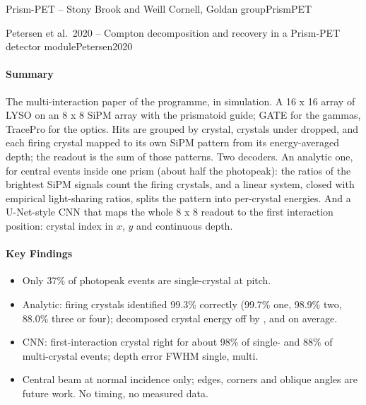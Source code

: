 \begin{programnote}{Prism-PET -- Stony Brook and Weill Cornell, Goldan group}{PrismPET}
\begin{papernote}{Petersen et al.\ 2020 -- Compton decomposition and recovery in a Prism-PET detector module}{Petersen2020}
\paragraph{Summary}
The multi-interaction paper of the programme, in simulation. A 16 x 16 array of
 LYSO on an 8 x 8 SiPM array with the prismatoid
guide; GATE for the gammas, TracePro for the optics. Hits are grouped by
crystal, crystals under  dropped, and each firing crystal mapped to its
own SiPM pattern from its energy-averaged depth; the readout is the sum of
those patterns. Two decoders. An analytic one, for central events inside one
prism (about half the photopeak): the ratios of the brightest SiPM signals count
the firing crystals, and a linear system, closed with empirical light-sharing
ratios, splits the pattern into per-crystal energies. And a U-Net-style CNN
that maps the whole 8 x 8 readout to the first interaction position: crystal
index in $x$, $y$ and continuous depth.

\paragraph{Key Findings}
\begin{itemize}
	\item Only 37\% of photopeak events are single-crystal at  pitch.
	\item Analytic: firing crystals identified 99.3\% correctly (99.7\% one,
		98.9\% two, 88.0\% three or four); decomposed crystal energy off by
		,  and  on average.
	\item CNN: first-interaction crystal right for about 98\% of single- and
		88\% of multi-crystal events; depth error  FWHM single,
		 multi.
	\item Central beam at normal incidence only; edges, corners and oblique
		angles are future work. No timing, no measured data.
\end{itemize}


\end{papernote}
\end{programnote}
